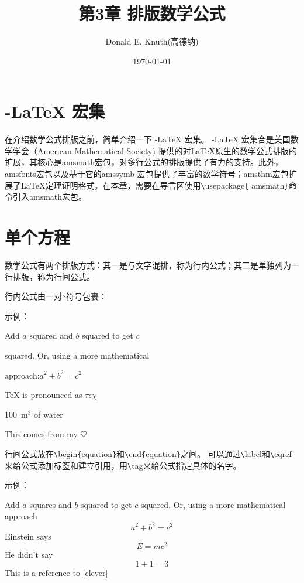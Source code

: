 \documentclass[UTF8]{ctexart}
\title{\heiti 第3章 \quad 排版数学公式}
\author{Donald E. Knuth(高德纳)}
\date{\today}
\begin{document}
\maketitle

\tableofcontents

\newpage
\section{ \AmS-\LaTeX{} 宏集}
在介绍数学公式排版之前，简单介绍一下 \AmS-\LaTeX{} 宏集。 \AmS-\LaTeX{} 宏集合是美国数学学会（American Mathematical Society)
提供的对\LaTeX 原生的数学公式排版的扩展，其核心是amsmath宏包，对多行公式的排版提供了有力的支持。此外，amsfonts宏包以及基于它的amssymb
宏包提供了丰富的数学符号；amsthm宏包扩展了\LaTeX 定理证明格式。在本章，需要在导言区使用\texttt{\textbackslash}usepackage\texttt{\{}
amsmath\texttt{\}}命令引入amsmath宏包。
\section{单个方程}
数学公式有两个排版方式：其一是与文字混排，称为行内公式；其二是单独列为一行排版，称为行间公式。

行内公式由一对\$符号包裹：

示例：

Add $a$ squared and $b$ squared to get $c$

squared. Or, using a more mathematical

approach:$a^2 + b^2 = c^2$
\newline

\TeX{} is pronounced as $\tau\epsilon\chi$

100~m$^{3}$ of water

This comes from my $\heartsuit$

行间公式放在\texttt{\textbackslash}begin\texttt{\{}equation\texttt{\}}和\texttt{\textbackslash}end\texttt{\{}equation\texttt{\}}之间。
可以通过\texttt{\textbackslash}label和\texttt{\textbackslash}eqref来给公式添加标签和建立引用，用\texttt{\textbackslash}tag来给公式指定具体的名字。

示例：

Add $a$ squares and $b$ squared to get
$c$ squared. Or, using a more mathematical approach
\begin{equation}
  a^2 + b^2 = c^2
\end{equation}
\qquad Einstein says
\begin{equation}
  E = mc^2 \label{clever}
\end{equation}
\qquad He didn't say
\begin{equation}
  1 + 1 = 3 \tag{dumb}
\end{equation}
\qquad This is a reference to
\eqref{clever}
\end{document}
